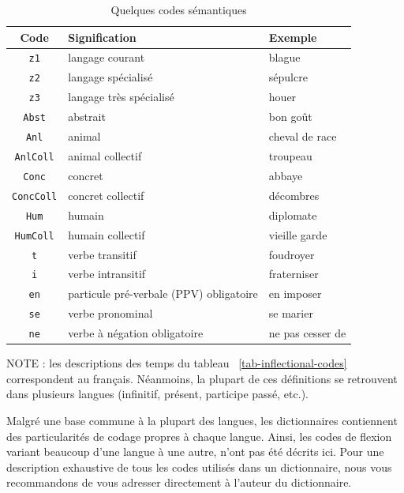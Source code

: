 \begin{table}[!h]
\begin{center}
\begin{tabular}{|c|l|l|}
\hline
\textbf{Code} & \textbf{Signification} & \textbf{Exemple} \\
\hline
\verb+z1+ & langage courant & blague \\
\hline
\verb+z2+ & langage spécialisé & sépulcre \\
\hline
\verb+z3+ & langage très spécialisé & houer \\
\hline
\verb+Abst+ & abstrait & bon goût \\
\hline
\verb+Anl+ & animal & cheval de race \\
\hline
\verb+AnlColl+ & animal collectif & troupeau \\
\hline
\verb+Conc+ & concret & abbaye \\
\hline
\verb+ConcColl+ & concret collectif & décombres \\
\hline
\verb+Hum+ & humain & diplomate \\
\hline
\verb+HumColl+ & humain collectif & vieille garde \\
\hline
\verb+t+ & verbe transitif & foudroyer \\
\hline
\verb+i+ & verbe intransitif & fraterniser \\
\hline
\verb+en+ & particule pré-verbale (PPV) obligatoire & en imposer \\
\hline
\verb+se+ & verbe pronominal & se marier \\
\hline
\verb+ne+ & verbe à négation obligatoire & ne pas cesser de \\
\hline
\end{tabular}
\caption{Quelques codes sémantiques\label{tab-semantic-codes}}
\end{center}
\end{table}

\noindent NOTE : les descriptions des temps du tableau ~\ref{tab-inflectional-codes} correspondent
au français. Néanmoins, la plupart de ces définitions se retrouvent dans plusieurs langues
(infinitif, présent, participe passé, etc.).


\bigskip
\noindent Malgré une base commune à la plupart des langues, les dictionnaires contiennent des
particularités de codage propres à chaque langue. Ainsi, les codes de flexion variant
beaucoup d’une langue à une autre, n’ont pas été décrits ici. Pour une description exhaustive
de tous les codes utilisés dans un dictionnaire, nous vous recommandons de vous adresser
directement à l’auteur du dictionnaire.


